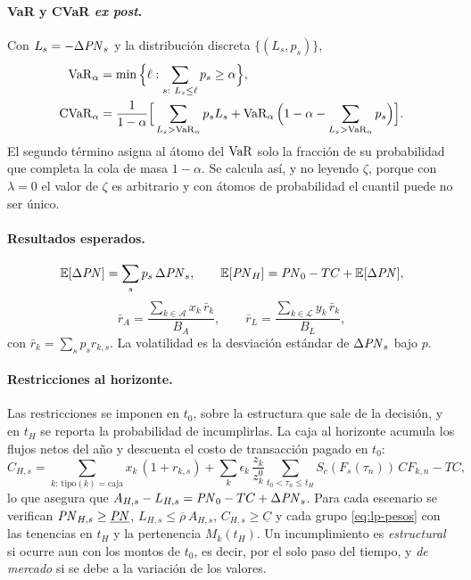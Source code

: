 \paragraph{VaR y CVaR \emph{ex post}.} Con $L_s = -\Delta\mathit{PN}_s$ y la distribución discreta $\{(L_s, p_s)\}$,
\begin{align}
  \operatorname{VaR}_\alpha &= \min\Big\{\ell : \sum_{s:\ L_s \le \ell} p_s \ge \alpha\Big\},\\
  \operatorname{CVaR}_\alpha &= \frac{1}{1-\alpha}\Big[\sum_{L_s > \operatorname{VaR}_\alpha} p_s L_s
    + \operatorname{VaR}_\alpha\Big(1-\alpha-\sum_{L_s > \operatorname{VaR}_\alpha} p_s\Big)\Big].
\end{align}
El segundo término asigna al átomo del $\operatorname{VaR}$ solo la fracción de su probabilidad que completa la cola de
masa $1-\alpha$. Se calcula así, y no leyendo $\zeta$, porque con $\lambda = 0$ el valor de $\zeta$ es
arbitrario y con átomos de probabilidad el cuantil puede no ser único.

\paragraph{Resultados esperados.}
\[
  \mathbb{E}[\Delta\mathit{PN}] = \sum_s p_s\,\Delta\mathit{PN}_s,\qquad
  \mathbb{E}[\mathit{PN}_H] = \mathit{PN}_0 - TC + \mathbb{E}[\Delta\mathit{PN}],
\]
\[
  \bar r_A = \frac{\sum_{k \in \mathcal{A}} x_k\, \bar r_k}{B_A},\qquad
  \bar r_L = \frac{\sum_{k \in \mathcal{L}} y_k\, \bar r_k}{B_L},
\]
con $\bar r_k = \sum_s p_s r_{k,s}$. La volatilidad es la desviación estándar de $\Delta\mathit{PN}_s$ bajo $p$.

\paragraph{Restricciones al horizonte.} Las restricciones se imponen en $t_0$, sobre la estructura que sale
de la decisión, y en $t_H$ se reporta la probabilidad de incumplirlas. La caja al horizonte acumula los
flujos netos del año y descuenta el costo de transacción pagado en $t_0$:
\[
  C_{H,s} = \sum_{k:\ \text{tipo}(k) = \text{caja}} x_k\,(1 + r_{k,s})
  + \sum_{k} \epsilon_k\, \frac{z_k}{z_k^0} \sum_{t_0 < \tau_n \le t_H} S_c(F_s(\tau_n))\, CF_{k,n} - TC,
\]
lo que asegura que $A_{H,s} - L_{H,s} = \mathit{PN}_0 - TC + \Delta\mathit{PN}_s$. Para cada escenario se verifican
$\mathit{PN}_{H,s} \ge \underline{\mathit{PN}}$, $L_{H,s} \le \overline{\rho}\,A_{H,s}$, $C_{H,s} \ge \underline{C}$ y cada
grupo \eqref{eq:lp-pesos} con las tenencias en $t_H$ y la pertenencia $M_k(t_H)$. Un incumplimiento es
\emph{estructural} si ocurre aun con los montos de $t_0$, es decir, por el solo paso del tiempo, y \emph{de
mercado} si se debe a la variación de los valores.

